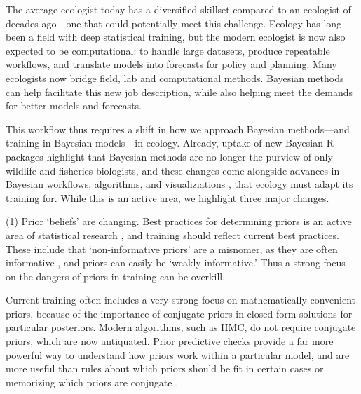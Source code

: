 \documentclass[11pt]{article}
\begin{document}
{The average ecologist today has a diversified skillset compared to an ecologist of decades ago---one that could potentially meet this challenge. Ecology has long been a field with deep statistical training, but the modern ecologist is now also expected to be computational: to handle large datasets, produce repeatable workflows, and translate models into forecasts for policy and planning. Many ecologists now bridge field, lab and computational methods. Bayesian methods can help facilitate this new job description, while also helping meet the demands for better models and forecasts. %

This workflow thus requires a shift in how we approach Bayesian methods---and training in Bayesian models---in ecology. Already, uptake of new Bayesian \textsf{R} packages highlight that Bayesian methods are no longer the purview of only wildlife and fisheries biologists, and these changes come alongside advances in Bayesian workflows, algorithms, and visualiziations \citep[e.g.][]{betanworkflow,vandeschoot2021,gabryvis}, that ecology must adapt its training for. While this is an active area, we highlight three major changes.

(1) Prior `beliefs' are changing. Best practices for determining priors is an active area of statistical research \citep{BDA,regotherstories,betanprior}, and training should reflect current best practices. These include that `non-informative priors' are a misnomer, as they are often informative  \citep{lemoine2019}, and priors can easily be `weakly informative.' Thus a strong focus on the dangers of priors in training can be overkill. %

Current training often includes a very strong focus on mathematically-convenient priors, because of the importance of conjugate priors in closed form solutions for particular posteriors. Modern algorithms, such as HMC, do not require conjugate priors, which are now antiquated. Prior predictive checks provide a far more powerful way to understand how priors work within a particular model, and are more useful than rules about which priors should be fit in certain cases or memorizing which priors are conjugate \citep{betanprior}. %

}
\end{document}
